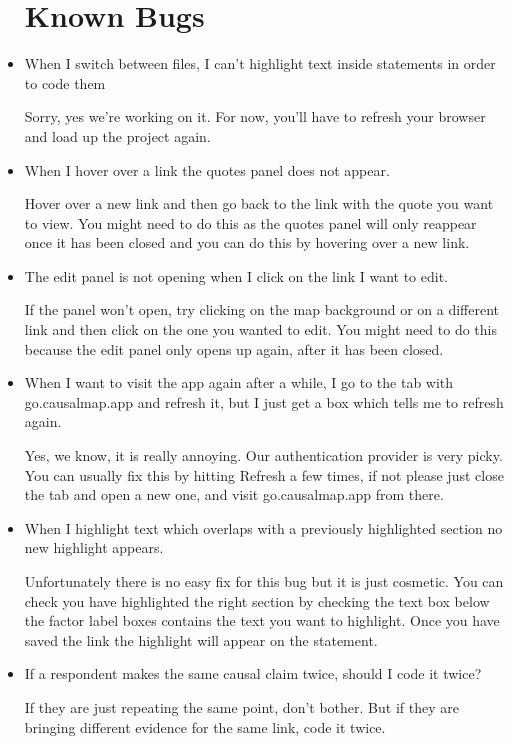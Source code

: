 \documentclass[
]{book}
\begin{document}
\begin{itemize}
  \hypertarget{known-bugs}{%
  \section{Known Bugs}\label{known-bugs}}
\item
  When I switch between files, I can't highlight text inside statements in order to code them

  Sorry, yes we're working on it. For now, you'll have to refresh your browser and load up the project again.
\item
  When I hover over a link the quotes panel does not appear.

  Hover over a new link and then go back to the link with the quote you want to view. You might need to do this as the quotes panel will only reappear once it has been closed and you can do this by hovering over a new link.
\item
  The edit panel is not opening when I click on the link I want to edit.

  If the panel won't open, try clicking on the map background or on a different link and then click on the one you wanted to edit. You might need to do this because the edit panel only opens up again, after it has been closed.
\item
  When I want to visit the app again after a while, I go to the tab with go.causalmap.app and refresh it, but I just get a box which tells me to refresh again.

  Yes, we know, it is really annoying. Our authentication provider is very picky. You can usually fix this by hitting Refresh a few times, if not please just close the tab and open a new one, and visit go.causalmap.app from there.
\item
  When I highlight text which overlaps with a previously highlighted section no new highlight appears.

  Unfortunately there is no easy fix for this bug but it is just cosmetic. You can check you have highlighted the right section by checking the text box below the factor label boxes contains the text you want to highlight. Once you have saved the link the highlight will appear on the statement.
\item
  If a respondent makes the same causal claim twice, should I code it twice?

  If they are just repeating the same point, don't bother. But if they are bringing different evidence for the same link, code it twice.
\end{itemize}
\end{document}
